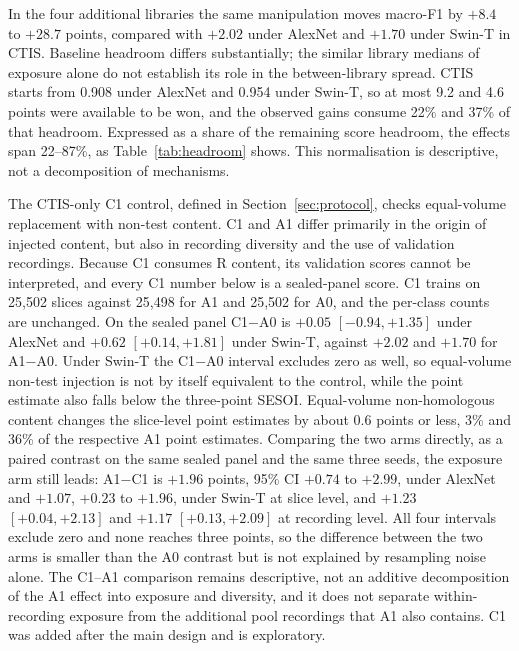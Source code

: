 In the four additional libraries the same manipulation moves macro-F1 by $+8.4$ to $+28.7$
points, compared with $+2.02$ under AlexNet and $+1.70$ under Swin-T in CTIS. Baseline headroom differs
substantially; the similar library medians of exposure alone do not establish its role in the
between-library spread. CTIS starts
from 0.908 under AlexNet and 0.954 under Swin-T, so at most 9.2 and 4.6 points were available to
be won, and the observed gains consume 22\% and 37\% of that headroom. Expressed as a share of
the remaining score headroom, the effects span 22--87\%, as Table~\ref{tab:headroom} shows.
This normalisation is descriptive, not a decomposition of mechanisms.

The CTIS-only C1 control, defined in Section~\ref{sec:protocol}, checks equal-volume
replacement with non-test content. C1 and A1 differ primarily in the origin of injected content,
but also in recording diversity and the use of validation recordings. Because C1 consumes R content, its validation scores cannot be interpreted, and every C1 number below is a sealed-panel score. C1
trains on 25{,}502 slices against 25{,}498 for A1 and 25{,}502 for A0, and the per-class counts are
unchanged. On the sealed panel C1$-$A0 is $+0.05$ $[-0.94,+1.35]$ under AlexNet and $+0.62$
$[+0.14,+1.81]$ under Swin-T, against $+2.02$ and $+1.70$ for A1$-$A0. Under Swin-T the C1$-$A0
interval excludes zero as well, so equal-volume non-test injection is not by itself equivalent to
the control, while the point estimate also falls below the three-point SESOI. Equal-volume non-homologous
content changes the slice-level point estimates by about 0.6 points or less, 3\% and 36\% of the respective
A1 point estimates. Comparing the two arms directly, as a paired contrast on the same sealed panel
and the same three seeds, the exposure arm still leads: A1$-$C1 is $+1.96$ points, 95\% CI $+0.74$
to $+2.99$, under AlexNet and $+1.07$, $+0.23$ to $+1.96$, under Swin-T at slice level, and
$+1.23$ $[+0.04,+2.13]$ and $+1.17$ $[+0.13,+2.09]$ at recording level. All four intervals exclude
zero and none reaches three points, so the difference between the two arms is smaller than the
A0 contrast but is not explained by resampling noise alone. The C1--A1 comparison remains
descriptive, not an additive decomposition of the A1 effect into exposure and diversity, and it
does not separate within-recording exposure from the additional pool recordings that A1 also
contains. C1 was added after the main design and is exploratory.

